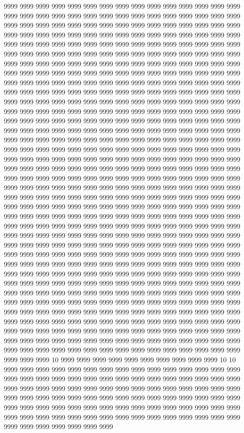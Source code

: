 9999 9999 9999 9999 9999 9999 9999 9999 9999 9999 9999 9999 9999 9999 9999 9999 9999 9999 9999 9999 9999 9999 9999 9999 9999 9999 9999 9999 9999 9999 9999 9999 9999 9999 9999 9999 9999 9999 9999 9999 9999 9999 9999 9999 9999 9999 9999 9999 9999 9999 9999 9999 9999 9999 9999 9999 9999 9999 9999 9999 9999 9999 9999 9999 9999 9999 9999 9999 9999 9999 9999 9999 9999 9999 9999 9999 9999 9999 9999 9999 9999 9999 9999 9999 9999 9999 9999 9999 9999 9999 9999 9999 9999 9999 9999 9999 9999 9999 9999 9999 9999 9999 9999 9999 9999 9999 9999 9999 9999 9999 9999 9999 9999 9999 9999 9999 9999 9999 9999 9999 9999 9999 9999 9999 9999 9999 9999 9999 9999 9999 9999 9999 9999 9999 9999 9999 9999 9999 9999 9999 9999 9999 9999 9999 9999 9999 9999 9999 9999 9999 9999 9999 9999 9999 9999 9999 9999 9999 9999 9999 9999 9999 9999 9999 9999 9999 9999 9999 9999 9999 9999 9999 9999 9999 9999 9999 9999 9999 9999 9999 9999 9999 9999 9999 9999 9999 9999 9999 9999 9999 9999 9999 9999 9999 9999 9999 9999 9999 9999 9999 9999 9999 9999 9999 9999 9999 9999 9999 9999 9999 9999 9999 9999 9999 9999 9999 9999 9999 9999 9999 9999 9999 9999 9999 9999 9999 9999 9999 9999 9999 9999 9999 9999 9999 9999 9999 9999 9999 9999 9999 9999 9999 9999 9999 9999 9999 9999 9999 9999 9999 9999 9999 9999 9999 9999 9999 9999 9999 9999 9999 9999 9999 9999 9999 9999 9999 9999 9999 9999 9999 9999 9999 9999 9999 9999 9999 9999 9999 9999 9999 9999 9999 9999 9999 9999 9999 9999 9999 9999 9999 9999 9999 9999 9999 9999 9999 9999 9999 9999 9999 9999 9999 9999 9999 9999 9999 9999 9999 9999 9999 9999 9999 9999 9999 9999 9999 9999 9999 9999 9999 9999 9999 9999 9999 9999 9999 9999 9999 9999 9999 9999 9999 9999 9999 9999 9999 9999 9999 9999 9999 9999 9999 9999 9999 9999 9999 9999 9999 9999 9999 9999 9999 9999 9999 9999 9999 9999 9999 9999 9999 9999 9999 9999 9999 9999 9999 9999 9999 9999 9999 9999 9999 9999 9999 9999 9999 9999 9999 9999 9999 9999 9999 9999 9999 9999 9999 9999 9999 9999 9999 9999 9999 9999 9999 9999 9999 9999 9999 9999 9999 9999 9999 9999 9999 9999 9999 9999 9999 9999 9999 9999 9999 9999 9999 9999 9999 9999 9999 9999 9999 9999 9999 9999 9999 9999 9999 9999 9999 9999 9999 9999 9999 9999 9999 9999 9999 9999 9999 9999 9999 9999 9999 9999 9999 9999 9999 9999 9999 9999 9999 9999 9999 9999 9999 9999 9999 9999 9999 9999 9999 9999 9999 9999 9999 9999 9999 9999 9999 9999 9999 9999 9999 9999 9999 9999 9999 9999 9999 9999 9999 9999 9999 9999 9999 9999 9999 9999 9999 9999 9999 9999 9999 9999 9999 9999 9999 9999 9999 9999 9999 9999 9999 9999 9999 9999 9999 9999 9999 9999 9999 9999 9999 9999 9999 9999 9999 9999 9999 9999 9999 9999 9999 9999 9999 9999 9999 9999 9999 9999 9999 9999 9999 9999 9999 9999 9999 9999 9999 9999 9999 9999 9999 9999 9999 9999 9999 9999 9999 9999 9999 9999 9999 9999 9999 9999 9999 9999 9999 10 9999 9999 9999 9999 9999 9999 9999 9999 9999 9999 10 10 9999 9999 9999 9999 9999 9999 9999 9999 9999 9999 9999 9999 9999 9999 9999 9999 9999 9999 9999 9999 9999 9999 9999 9999 9999 9999 9999 9999 9999 9999 9999 9999 9999 9999 9999 9999 9999 9999 9999 9999 9999 9999 9999 9999 9999 9999 9999 9999 9999 9999 9999 9999 9999 9999 9999 9999 9999 9999 9999 9999 9999 9999 9999 9999 9999 9999 9999 9999 9999 9999 9999 9999 9999 9999 9999 9999 9999 9999 9999 9999 9999 9999 9999 9999 9999 9999 9999 9999 9999 9999 9999 9999 9999 9999 9999 9999 9999 